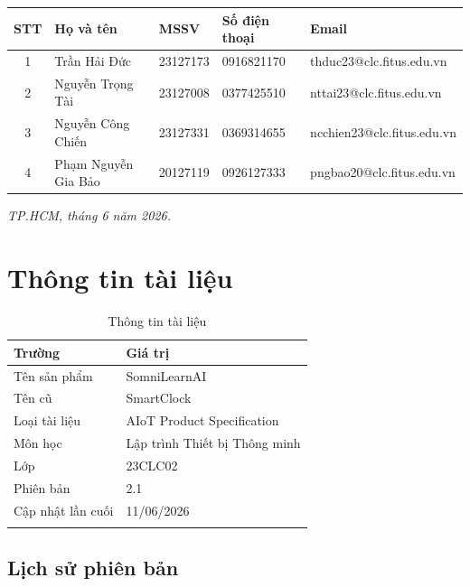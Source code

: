 \documentclass[12pt,a4paper]{article}
\renewcommand{\arraystretch}{1.25}
\begin{document}
\begin{center}
    \scriptsize
    \renewcommand{\arraystretch}{1.12}
    \begin{tabularx}{\textwidth}{|c|P{3.1cm}|P{1.9cm}|P{2.3cm}|X|}
    \hline
    \textbf{STT} & \textbf{Họ và tên} & \textbf{MSSV} & \textbf{Số điện thoại} & \textbf{Email} \\
     & Trần Hải Đức & 23127173 & 0916821170 & thduc23@clc.fitus.edu.vn \\
     & Nguyễn Trọng Tài & 23127008 & 0377425510 & nttai23@clc.fitus.edu.vn \\
     & Nguyễn Công Chiến & 23127331 & 0369314655 & ncchien23@clc.fitus.edu.vn \\
     & Phạm Nguyễn Gia Bảo & 20127119 & 0926127333 & pngbao20@clc.fitus.edu.vn \\
    \hline
    \end{tabularx}
    \renewcommand{\arraystretch}{1.25}
    \normalsize

    \vfill
    \textit{TP.HCM, tháng 6 năm 2026.}
\end{center}

\newpage

\section*{Thông tin tài liệu}

\begin{longtable}{|P{4.5cm}|P{9.5cm}|}
\hline
\textbf{Trường} & \textbf{Giá trị} \\
\hline
Tên sản phẩm & SomniLearnAI \\
\hline
Tên cũ & SmartClock \\
\hline
Loại tài liệu & AIoT Product Specification \\
\hline
Môn học & Lập trình Thiết bị Thông minh \\
\hline
Lớp & 23CLC02 \\
\hline
Phiên bản & 2.1 \\
\hline
Cập nhật lần cuối & 11/06/2026 \\
\hline
\caption{Thông tin tài liệu}
\end{longtable}

\subsection*{Lịch sử phiên bản}
\end{document}
